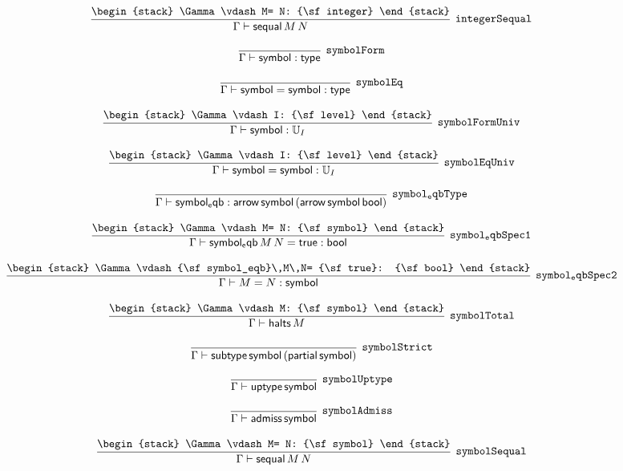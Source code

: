 \[
\infer[{\tt integerSequal}]{\Gamma \vdash {\sf sequal}\,M\,N}{
\begin{stack}
\Gamma \vdash M= N: {\sf integer}
\end{stack}}
\]

\[
\infer[{\tt symbolForm}]{\Gamma \vdash {\sf symbol}: {\sf type}}{}
\]

\[
\infer[{\tt symbolEq}]{\Gamma \vdash {\sf symbol}= {\sf symbol}: {\sf type}}{}
\]

\[
\infer[{\tt symbolFormUniv}]{\Gamma \vdash {\sf symbol}: {\Bbb U}_{I}}{
\begin{stack}
\Gamma \vdash I: {\sf level}
\end{stack}}
\]

\[
\infer[{\tt symbolEqUniv}]{\Gamma \vdash {\sf symbol}= {\sf symbol}: {\Bbb U}_{I}}{
\begin{stack}
\Gamma \vdash I: {\sf level}
\end{stack}}
\]

\[
\infer[{\tt symbol_eqbType}]{\Gamma \vdash {\sf symbol_eqb}: {\sf arrow}\,{\sf symbol}\,({\sf arrow}\,{\sf symbol}\,{\sf bool})}{}
\]

\[
\infer[{\tt symbol_eqbSpec1}]{\Gamma \vdash {\sf symbol_eqb}\,M\,N= {\sf true}: {\sf bool}}{
\begin{stack}
\Gamma \vdash M= N: {\sf symbol}
\end{stack}}
\]

\[
\infer[{\tt symbol_eqbSpec2}]{\Gamma \vdash M= N: {\sf symbol}}{
\begin{stack}
\Gamma \vdash {\sf symbol_eqb}\,M\,N= {\sf true}: {\sf bool}
\end{stack}}
\]

\[
\infer[{\tt symbolTotal}]{\Gamma \vdash {\sf halts}\,M}{
\begin{stack}
\Gamma \vdash M: {\sf symbol}
\end{stack}}
\]

\[
\infer[{\tt symbolStrict}]{\Gamma \vdash {\sf subtype}\,{\sf symbol}\,({\sf partial}\,{\sf symbol})}{}
\]

\[
\infer[{\tt symbolUptype}]{\Gamma \vdash {\sf uptype}\,{\sf symbol}}{}
\]

\[
\infer[{\tt symbolAdmiss}]{\Gamma \vdash {\sf admiss}\,{\sf symbol}}{}
\]

\[
\infer[{\tt symbolSequal}]{\Gamma \vdash {\sf sequal}\,M\,N}{
\begin{stack}
\Gamma \vdash M= N: {\sf symbol}
\end{stack}}
\]

